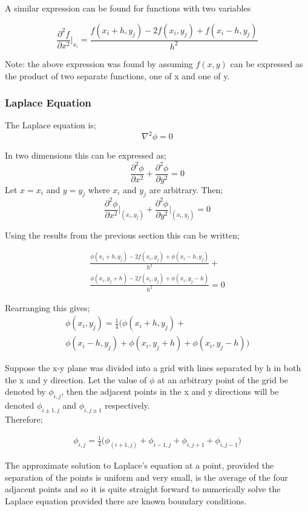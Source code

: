 \documentclass[aps,twocolumn,pre,nofootinbib,10pt]{revtex4-1}
\begin{document}
A similar expression can be found for functions with two variables

\[\frac{\partial^2f}{\partial x^2}\Bigg|_{x_i} = \frac{f(x_i+h,y_j)-2f(x_i,y_j)+f(x_i-h,y_j)}{h^2}\]

Note: the above expression was found by assuming $f(x,y)$ can be expressed as the product of two separate functions, one of x and one of y. \\


\subsubsection{Laplace Equation}

The Laplace equation is;
\[\nabla^2\phi = 0\]

In two dimensions this can be expressed as;
\[\frac{\partial^2\phi}{\partial x^2} + \frac{\partial^2\phi}{\partial y^2} = 0\]
Let \(x=x_i\) and \(y=y_j\) where \(x_i\) and \(y_j\) are arbitrary. Then;
\[\frac{\partial^2\phi}{\partial x^2}\Bigg|_{(x_{i},y_{j})} + \frac{\partial^2\phi}{\partial y^2}\Bigg|_{(x_{i},y_{j})} = 0\]

Using the results from the previous section this can be written;

\begin{gather*}
\frac{\phi(x_i+h,y_j)-2f(x_i,y_j)+\phi(x_i-h,y_j)}{h^2}+ \\
\frac{\phi(x_i,y_j+h)-2f(x_i,y_j)+\phi(x_i,y_j-h)}{h^2}=0
\end{gather*}

Rearranging this gives;
\begin{gather*}
\phi(x_i,y_j)=\frac{1}{4}\Bigg(\phi(x_i+h,y_j)+ \\
\phi(x_i-h,y_j)+\phi(x_i,y_j+h)+\phi(x_i,y_j-h)\Bigg)
\end{gather*}

Suppose the x-y plane was divided into a grid with lines separated by h in both the x and y direction. Let the value of \(\phi\) at an arbitrary point of the grid be denoted by \(\phi_{i,j}\), then the adjacent points in the x and y directions will be denoted \(\phi_{i\pm1,j}\) and \(\phi_{i,j\pm1}\) respectively.\\Therefore;

\begin{gather*}
\phi_{i,j}=\frac{1}{4}\Bigg(\phi_{(i+1,j)}+
\phi_{i-1,j}+\phi_{i,j+1}+\phi_{i,j-1}\Bigg)
\end{gather*}

The approximate solution to Laplace's equation at a point, provided the separation of the points is uniform and very small, is the average of the four adjacent points and so it is quite straight forward to numerically solve the Laplace equation provided there are known boundary conditions.
\end{document}
